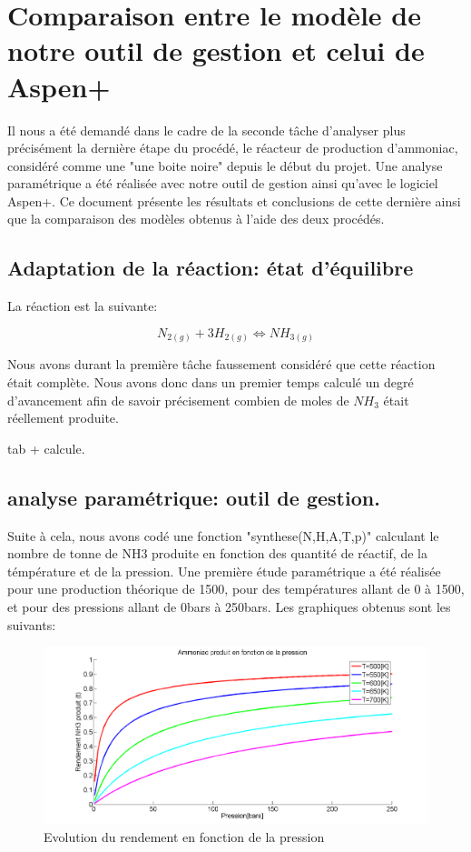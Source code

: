 

\section*{Comparaison entre le modèle de notre outil de gestion et celui de Aspen+}
Il nous a été demandé dans le cadre de la seconde tâche d'analyser plus précisément la dernière étape du procédé, le réacteur de production d'ammoniac, considéré comme une "une boite noire" depuis le début du projet. Une analyse paramétrique a été réalisée avec notre outil de gestion ainsi qu'avec le logiciel Aspen+. Ce document présente les résultats et conclusions de cette dernière ainsi que la comparaison des modèles obtenus à l'aide des deux procédés.

\subsection{Adaptation de la réaction: état d'équilibre}
La réaction est la suivante:

$$N_{2(g)} + 3H_{2(g)} \Leftrightarrow NH_{3(g)}$$

Nous avons durant la première tâche faussement considéré que cette réaction était complète. Nous avons donc dans un premier temps calculé un degré d'avancement afin de savoir précisement combien de moles de $NH_3$ était réellement produite. 

tab + calcule.
\subsection*{analyse paramétrique: outil de gestion.}
Suite à cela, nous avons codé une fonction "synthese(N,H,A,T,p)" calculant le nombre de tonne de NH3 produite en fonction des quantité de réactif, de la témpérature et de la pression. Une première étude paramétrique a été réalisée pour une production théorique de \unit{1500}{\tonne}, pour des températures allant de \unit{0}{\celsius} à \unit{1500}{\celsius}, et pour des pressions allant de \unit{0}{bars} à \unit{250}{bars}. Les graphiques obtenus sont les suivants:

\begin{figure}[ht!]
 \centering
 \includegraphics[scale=0.2]{GrapheNH3P.png}
 \caption{Evolution du rendement en fonction de la pression}
 \label{scheme1}
\end{figure}

